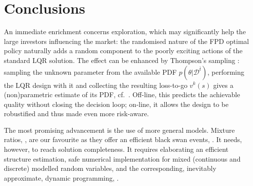 \section{Conclusions} \label{s:conclusions}


An immediate enrichment concerns exploration, which may significantly help the large investors influencing the market: the randomised nature of the FPD optimal policy naturally adds a random component to the poorly exciting actions of the standard LQR solution. The effect can be enhanced by Thompson's sampling \cite{Rusetal:18}: sampling the unknown parameter from the available PDF $p(\theta|\mathcal{D}^{\bar{t}})$, performing the LQR design with it and collecting the resulting loss-to-go $v^{k}(s)$ gives a (non)parametric estimate of its PDF, cf.\ \cite{KarJen:900078}. Off-line, this predicts the achievable quality without closing the decision loop; on-line, it allows the design to be robustified and thus made even more risk-aware.

The most promising advancement is the use of more general models. Mixture ratios, \cite{KarRum:21a}, are our favourite as they offer an efficient  black swan events, \cite{bogle2008black}. It needs, however,  to reach solution completeness. It requires elaborating an efficient structure estimation, safe numerical implementation for mixed (continuous and discrete) modelled random variables, and the corresponding, inevitably approximate, dynamic programming, \cite{SiBarPowWunsch:04}.
